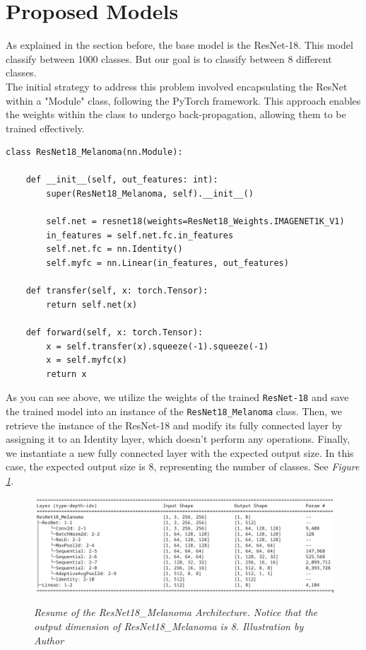 \section{Proposed Models}

As explained in the section before, the base model is the ResNet-18. This
model classify between 1000 classes. But our goal is to classify between 8
different classes. \\

The initial strategy to address this problem involved encapsulating the ResNet
within a "Module" class, following the PyTorch framework. This approach enables
the weights within the class to undergo back-propagation, allowing them to be
trained effectively.

\begin{Verbatim}[fontsize=\scriptsize]
class ResNet18_Melanoma(nn.Module):

    def __init__(self, out_features: int):
        super(ResNet18_Melanoma, self).__init__()

        self.net = resnet18(weights=ResNet18_Weights.IMAGENET1K_V1)
        in_features = self.net.fc.in_features
        self.net.fc = nn.Identity()
        self.myfc = nn.Linear(in_features, out_features)

    def transfer(self, x: torch.Tensor):
        return self.net(x)

    def forward(self, x: torch.Tensor):
        x = self.transfer(x).squeeze(-1).squeeze(-1)
        x = self.myfc(x)
        return x
\end{Verbatim}

As you can see above, we utilize the weights of the trained {\tt ResNet-18} and
save the trained model into an instance of the {\tt ResNet18\_Melanoma} class.
Then, we retrieve the instance of the ResNet-18 and modify its fully
connected layer by assigning it to an Identity layer, which doesn't perform any
operations. Finally, we instantiate a new fully connected layer with the
expected output size. In this case, the expected output size is 8, representing
the number of classes. See \textit{Figure \ref{fig:resnet-18-melanoma-arch}}.

\begin{figure}[H]
  \centering
  \includegraphics[width=\textwidth]{imatges/methodological_contribution/ResNet18_Melanoma.png}
  \caption[Resume of the ResNet18\_Melanoma Architecture]{\textit{Resume of the ResNet18\_Melanoma Architecture. Notice that the output dimension of ResNet18\_Melanoma is 8. Illustration by Author}}
  {\label{fig:resnet-18-melanoma-arch}}
\end{figure}


